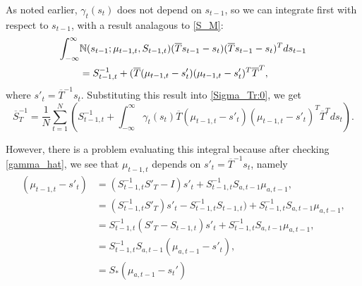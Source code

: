 \documentclass[12pt,leqno]{article}
\begin{document}
As noted earlier, $\gamma_t(s_t)$ does not depend on $s_{t-1}$, so we can integrate first with respect to $s_{t-1}$, with
a result analagous to \eqref{S_M}:
\begin{align*}
  \int_{-\infty}^{\infty}&{\mathbb N}(s_{t-1};\mu_{t-1,t},S_{t-1,t})(\overline{T}s_{t-1}-s_t)
  (\overline{T}s_{t-1}-s_t)^Tds_{t-1}\\ &= S_{t-1,t}^{-1} +
(\overline{T}(\mu_{t-1,t}-s'_t)(\mu_{t-1,t}-s'_t)^T\overline{T}^T,
\end{align*}
where $s'_t = \overline{T}^{-1}s_t$.
Substituting this result into \eqref{Sigma_Tr:0}, we get
\begin{equation}\label{Sigma_Tr:1}
  \overline{S}_T^{-1} =  \frac{1}{N}\sum_{t=1}^N\left(S_{t-1,t}^{-1} +\int_{-\infty}^{\infty}\gamma_t(s_t)
  \overline{T}(\mu_{t-1,t}-s'_t)(\mu_{t-1,t}-s'_t)^T\overline{T}^Tds_t\right).
\end{equation}

However, there is a problem evaluating this integral because after checking \eqref{gamma_hat}, we see that $\mu_{t-1,t}$
depends on $s'_t = \overline{T}^{-1}s_t$, namely 
\begin{equation}\label{s-mu_1}
  \begin{split}
    \left(\mu_{t-1,t}-s'_t\right) &= (S_{t-1,t}^{-1}S'_T - I)s'_t + S_{t-1,t}^{-1}S_{a,t-1}\mu_{a,t-1}, \\
    &= (S_{t-1,t}^{-1}S'_T)s'_t - S_{t-1,t}^{-1}S_{t-1,t}) + S_{t-1,t}^{-1}S_{a,t-1}\mu_{a,t-1}, \\
    &= S_{t-1,t}^{-1}(S'_T - S_{t-1,t} )s'_t + S_{t-1,t}^{-1}S_{a,t-1}\mu_{a,t-1}, \\
    &= S_{t-1,t}^{-1}S_{a,t-1}(\mu_{a,t-1}-s'_t),\\
    &= S_*(\mu_{a,t-1}-s_t')
  \end{split}
\end{equation}
\end{document}
